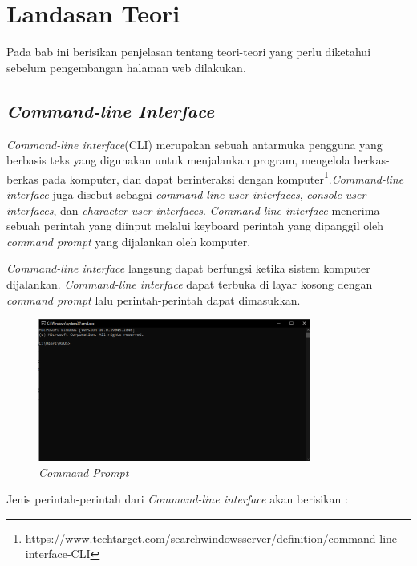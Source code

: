 \chapter{Landasan Teori}
\label{chap:teori}
Pada bab ini berisikan penjelasan tentang teori-teori yang perlu diketahui sebelum pengembangan halaman web dilakukan. 

\section{\textit{Command-line Interface}}
\label{sec:CLI}
\textit{Command-line interface}(CLI) merupakan sebuah antarmuka pengguna yang berbasis teks yang digunakan untuk menjalankan program, mengelola berkas-berkas pada komputer, dan dapat berinteraksi dengan komputer\footnote{https://www.techtarget.com/searchwindowsserver/definition/command-line-interface-CLI}.\textit{Command-line interface} juga disebut sebagai \textit{command-line user interfaces}, \textit{console user interfaces}, dan \textit{character user interfaces}. \textit{Command-line interface} menerima sebuah perintah yang diinput melalui keyboard perintah yang dipanggil oleh \textit{command prompt} yang dijalankan oleh komputer.

\textit{Command-line interface} langsung dapat berfungsi ketika sistem komputer dijalankan. \textit{Command-line interface} dapat terbuka di layar kosong dengan \textit{command prompt} lalu perintah-perintah dapat dimasukkan.   

\begin{figure}[H]
	\centering
	\includegraphics[width=0.8\textwidth]{Gambar/commandprompt.png}
	\caption{\textit{Command Prompt}}
	\label{fig:cmd}
\end{figure}

Jenis perintah-perintah dari \textit{Command-line interface} akan berisikan :

